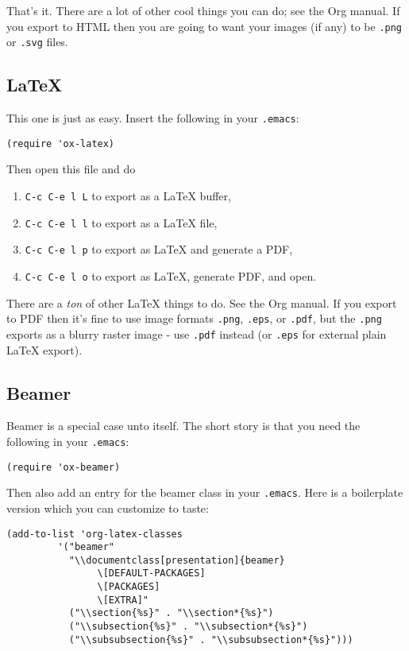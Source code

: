 \documentclass[11pt]{article}
\begin{document}
That's it.  There are a lot of other cool things you can do; see the Org manual.  If you export to HTML then you are going to want your images (if any) to be \texttt{.png} or \texttt{.svg} files.
\subsection[\LaTeX{}]{\LaTeX{}}
\label{sec-4-2}

This one is just as easy.  Insert the following in your \texttt{.emacs}:

\begin{verbatim}
(require 'ox-latex)
\end{verbatim}

Then open this file and do

\begin{enumerate}
\item \texttt{C-c C-e l L} to export as a \LaTeX{} buffer,
\item \texttt{C-c C-e l l} to export as a \LaTeX{} file,
\item \texttt{C-c C-e l p} to export as \LaTeX{} and generate a PDF,
\item \texttt{C-c C-e l o} to export as \LaTeX{}, generate PDF, and open.
\end{enumerate}

There are a \emph{ton} of other \LaTeX{} things to do.  See the Org manual.  If you export to PDF then it's fine to use image formats \texttt{.png}, \texttt{.eps}, or \texttt{.pdf}, but the \texttt{.png} exports as a blurry raster image - use \texttt{.pdf} instead (or \texttt{.eps} for external plain \LaTeX{} export).
\subsection[Beamer]{Beamer}
\label{sec-4-3}

Beamer is a special case unto itself.  The short story is that you need the following in your \texttt{.emacs}:

\begin{verbatim}
(require 'ox-beamer)
\end{verbatim}

Then also add an entry for the beamer class in your \texttt{.emacs}.  Here is a boilerplate version which you can customize to taste:

\begin{verbatim}
(add-to-list 'org-latex-classes
	     '("beamer"
	       "\\documentclass[presentation]{beamer}
                \[DEFAULT-PACKAGES]
                \[PACKAGES]
                \[EXTRA]"
	       ("\\section{%s}" . "\\section*{%s}")
	       ("\\subsection{%s}" . "\\subsection*{%s}")
	       ("\\subsubsection{%s}" . "\\subsubsection*{%s}")))
\end{verbatim}
\end{document}
